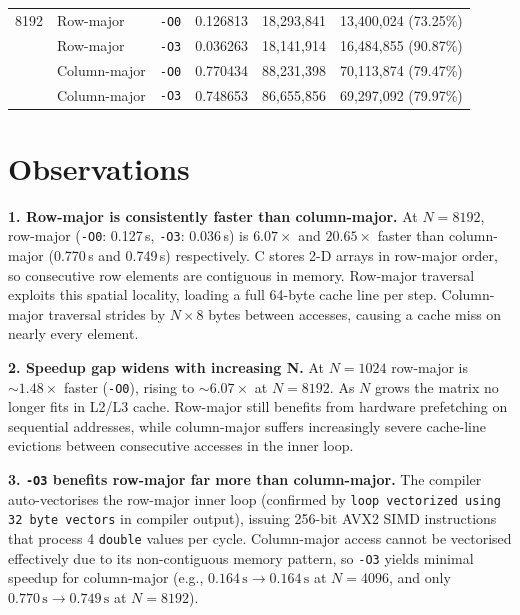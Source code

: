 \documentclass[10pt,a4paper]{article}
\begin{document}
\begin{table}[h!]
\begin{tabular}{c l l r r r}
8192 & Row-major    & \texttt{-O0} & 0.126813 & 18,293,841 & 13,400,024 (73.25\%) \\
     & Row-major    & \texttt{-O3} & 0.036263 & 18,141,914 & 16,484,855 (90.87\%) \\
\rowcolor{rowgray}
     & Column-major & \texttt{-O0} & 0.770434 & 88,231,398 & 70,113,874 (79.47\%) \\
\rowcolor{rowgray}
     & Column-major & \texttt{-O3} & 0.748653 & 86,655,856 & 69,297,092 (79.97\%) \\

\bottomrule
\end{tabular}

\end{table}

\vspace{1pt}

\section{Observations}

\textbf{1. Row-major is consistently faster than column-major.}
At $N=8192$, row-major (\texttt{-O0}: 0.127\,s, \texttt{-O3}: 0.036\,s) is $6.07\times$ and
$20.65\times$ faster than column-major (0.770\,s and 0.749\,s) respectively. C stores 2-D arrays
in row-major order, so consecutive row elements are contiguous in memory. Row-major traversal
exploits this spatial locality, loading a full 64-byte cache line per step. Column-major traversal
strides by $N \times 8$ bytes between accesses, causing a cache miss on nearly every element.

\textbf{2. Speedup gap widens with increasing N.}
At $N=1024$ row-major is $\sim1.48\times$ faster (\texttt{-O0}), rising to $\sim6.07\times$ at
$N=8192$. As $N$ grows the matrix no longer fits in L2/L3 cache. Row-major still benefits from
hardware prefetching on sequential addresses, while column-major suffers increasingly severe
cache-line evictions between consecutive accesses in the inner loop.

\textbf{3. \texttt{-O3} benefits row-major far more than column-major.}
The compiler auto-vectorises the row-major inner loop (confirmed by \texttt{loop vectorized using
32 byte vectors} in compiler output), issuing 256-bit AVX2 SIMD instructions that process 4
\texttt{double} values per cycle. Column-major access cannot be vectorised effectively due to its
non-contiguous memory pattern, so \texttt{-O3} yields minimal speedup for column-major
(e.g., $0.164\,\text{s} \to 0.164\,\text{s}$ at $N=4096$, and only $0.770\,\text{s} \to
0.749\,\text{s}$ at $N=8192$).
\end{document}
